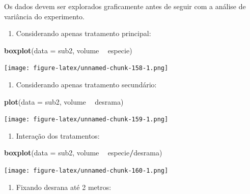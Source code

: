 \documentclass[
]{article}
\newenvironment{Shaded}{\begin{snugshade}}{\end{snugshade}}
\newcommand{\DataTypeTok}[1]{\textcolor[rgb]{0.13,0.29,0.53}{#1}}
\newcommand{\KeywordTok}[1]{\textcolor[rgb]{0.13,0.29,0.53}{\textbf{#1}}}
\newcommand{\NormalTok}[1]{#1}
\newcommand{\OperatorTok}[1]{\textcolor[rgb]{0.81,0.36,0.00}{\textbf{#1}}}
\newcommand{\StringTok}[1]{\textcolor[rgb]{0.31,0.60,0.02}{#1}}
\providecommand{\tightlist}{%
  \setlength{\itemsep}{0pt}\setlength{\parskip}{0pt}}
\begin{document}
Os dados devem ser explorados graficamente antes de seguir com a análise de variância do experimento.

\begin{enumerate}
\def\labelenumi{\arabic{enumi}.}
\tightlist
\item
  Considerando apenas tratamento principal:
\end{enumerate}

\begin{Shaded}
\begin{Highlighting}[]
\KeywordTok{boxplot}\NormalTok{(}\DataTypeTok{data =}\NormalTok{ sub2, volume }\OperatorTok{~}\StringTok{ }\NormalTok{especie)}
\end{Highlighting}
\end{Shaded}

\texttt{[image: figure-latex/unnamed-chunk-158-1.png]}

\begin{enumerate}
\def\labelenumi{\arabic{enumi}.}
\setcounter{enumi}{1}
\tightlist
\item
  Considerando apenas tratamento secundário:
\end{enumerate}

\begin{Shaded}
\begin{Highlighting}[]
\KeywordTok{plot}\NormalTok{(}\DataTypeTok{data =}\NormalTok{ sub2, volume }\OperatorTok{~}\StringTok{ }\NormalTok{desrama)}
\end{Highlighting}
\end{Shaded}

\texttt{[image: figure-latex/unnamed-chunk-159-1.png]}

\begin{enumerate}
\def\labelenumi{\arabic{enumi}.}
\setcounter{enumi}{2}
\tightlist
\item
  Interação dos tratamentos:
\end{enumerate}

\begin{Shaded}
\begin{Highlighting}[]
\KeywordTok{boxplot}\NormalTok{(}\DataTypeTok{data =}\NormalTok{ sub2, volume }\OperatorTok{~}\StringTok{ }\NormalTok{especie}\OperatorTok{/}\NormalTok{desrama)}
\end{Highlighting}
\end{Shaded}

\texttt{[image: figure-latex/unnamed-chunk-160-1.png]}

\begin{enumerate}
\def\labelenumi{\arabic{enumi}.}
\setcounter{enumi}{3}
\tightlist
\item
  Fixando desrana até 2 metros:
\end{enumerate}
\end{document}
